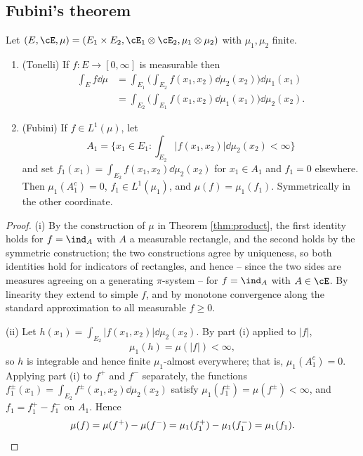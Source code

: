 \subsection{Fubini's theorem}

\begin{theorem}\label{thm:fubini}
	Let $(E,\cE,\mu) = (E_1\times E_2, \cE_1\otimes\cE_2,\mu_1\otimes\mu_2)$ with $\mu_1,\mu_2$ finite.
	\begin{enumerate}[label=(\roman*)]
		\item \textup{(Tonelli)} If $f : E \to[0,\infty]$ is measurable then
		\begin{align*}
			\int_E f\dd\mu &= \int_{E_1}\Big(\int_{E_2} f(x_1,x_2)\dd\mu_2(x_2)\Big)\dd\mu_1(x_1)\\
			&= \int_{E_2}\Big(\int_{E_1} f(x_1,x_2)\dd\mu_1(x_1)\Big)\dd\mu_2(x_2).
		\end{align*}
		\item \textup{(Fubini)} If $f \in L^1(\mu)$, let
		$$
		A_1 = \Big\{ x_1 \in E_1 : \int_{E_2}|f(x_1,x_2)|\dd\mu_2(x_2)<\infty\Big\}
		$$
		and set $f_1(x_1) = \int_{E_2}f(x_1,x_2)\dd\mu_2(x_2)$ for $x_1 \in A_1$ and $f_1 = 0$ elsewhere. Then $\mu_1(A_1^c) = 0$, $f_1 \in L^1(\mu_1)$, and $\mu(f) = \mu_1(f_1)$. Symmetrically in the other coordinate.
	\end{enumerate}
\end{theorem}
\begin{proof}
	(i) By the construction of $\mu$ in Theorem \ref{thm:product}, the first identity holds for $f = \ind_A$ with $A$ a measurable rectangle, and the second holds by the symmetric construction; the two constructions agree by uniqueness, so both identities hold for indicators of rectangles, and hence -- since the two sides are measures agreeing on a generating $\pi$-system -- for $f = \ind_A$ with $A \in \cE$. By linearity they extend to simple $f$, and by monotone convergence along the standard approximation to all measurable $f \geq 0$.

	(ii) Let $h(x_1) = \int_{E_2}|f(x_1,x_2)|\dd\mu_2(x_2)$. By part (i) applied to $|f|$,
	$$
	\mu_1(h) = \mu(|f|)<\infty,
	$$
	so $h$ is integrable and hence finite $\mu_1$-almost everywhere; that is, $\mu_1(A_1^c)=0$. Applying part (i) to $f^+$ and $f^-$ separately, the functions $f_1^\pm(x_1) = \int_{E_2}f^\pm(x_1,x_2)\dd\mu_2(x_2)$ satisfy $\mu_1(f_1^\pm) = \mu(f^\pm) < \infty$, and $f_1 = f_1^+ - f_1^-$ on $A_1$. Hence
	$$
	\mu(f) = \mu(f^+)-\mu(f^-) = \mu_1(f_1^+)-\mu_1(f_1^-) = \mu_1(f_1). \qedhere
	$$
\end{proof}

